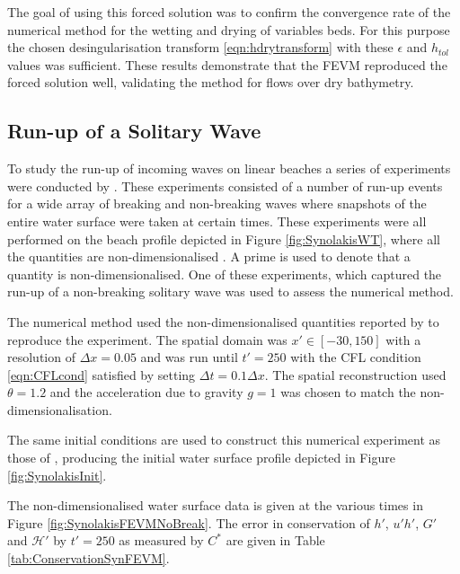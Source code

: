 \documentclass[times]{elsarticle}
\begin{document}
The goal of using this forced solution was to confirm the convergence rate of the numerical method for the wetting and drying of variables beds. For this purpose the chosen desingularisation transform \eqref{eqn:hdrytransform} with these $\epsilon$ and $h_{{tol}}$ values was sufficient. These results demonstrate that the FEVM reproduced the forced solution well, validating the method for flows over dry bathymetry. 

\subsection{Run-up of a Solitary Wave}

To study the run-up of incoming waves on linear beaches a series of experiments were conducted by \citet{Synolakis-1987-523}. These experiments consisted of a number of run-up events for a wide array of breaking and non-breaking waves where snapshots of the entire water surface were taken at certain times. These experiments were all performed on the beach profile depicted in Figure \ref{fig:SynolakisWT}, where all the quantities are non-dimensionalised \cite{Synolakis-1987-523}. A prime is used to denote that a quantity is non-dimensionalised. One of these experiments, which captured the run-up of a non-breaking solitary wave was used to assess the numerical method.

The numerical method used the non-dimensionalised quantities reported by \citet{Synolakis-1987-523} to reproduce the experiment. The spatial domain was $x' \in [-30,150]$ with a resolution of $\Delta x = 0.05$ and was run until $t' = 250$ with the CFL condition \eqref{eqn:CFLcond} satisfied by setting $\Delta t = 0.1 \Delta x$. The spatial reconstruction used $\theta = 1.2$ and the acceleration due to gravity $g= 1$ was chosen to match the non-dimensionalisation.

The same initial conditions are used to construct this numerical experiment as those of \citet{Li-2014-169}, producing the initial water surface profile depicted in Figure \ref{fig:SynolakisInit}. 

The non-dimensionalised water surface data is given at the various times in Figure \ref{fig:SynolakisFEVMNoBreak}. The error in conservation of $h'$, $u'h'$, $G'$ and $\mathcal{H}'$ by $t' = 250$ as measured by $C^*$ are given in Table \ref{tab:ConservationSynFEVM}. 
\end{document}

